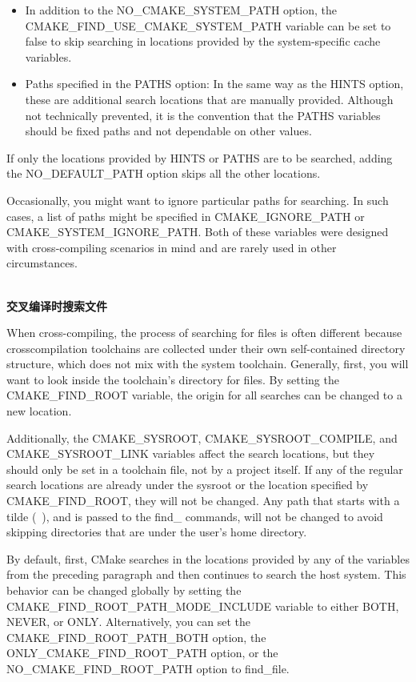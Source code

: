 \begin{itemize}
\item 
In addition to the NO\_CMAKE\_SYSTEM\_PATH option, the CMAKE\_FIND\_USE\_CMAKE\_SYSTEM\_PATH variable can be set to false to skip searching in locations provided by the system-specific cache variables.

\item 
Paths specified in the PATHS option: In the same way as the HINTS option, these are additional search locations that are manually provided. Although not technically prevented, it is the convention that the PATHS variables should be fixed paths and not dependable on other values.
\end{itemize}

If only the locations provided by HINTS or PATHS are to be searched, adding the NO\_DEFAULT\_PATH option skips all the other locations.

Occasionally, you might want to ignore particular paths for searching. In such cases, a list of paths might be specified in CMAKE\_IGNORE\_PATH or CMAKE\_SYSTEM\_IGNORE\_PATH. Both of these variables were designed with cross-compiling scenarios in mind and are rarely used in other circumstances.

\hspace*{\fill} \\ %
\noindent
\textbf{交叉编译时搜索文件}

When cross-compiling, the process of searching for files is often different because crosscompilation toolchains are collected under their own self-contained directory structure, which does not mix with the system toolchain. Generally, first, you will want to look inside the toolchain's directory for files. By setting the CMAKE\_FIND\_ROOT variable, the origin for all searches can be changed to a new location.

Additionally, the CMAKE\_SYSROOT, CMAKE\_SYSROOT\_COMPILE, and CMAKE\_SYSROOT\_LINK variables affect the search locations, but they should only be set in a toolchain file, not by a project itself. If any of the regular search locations are already under the sysroot or the location specified by CMAKE\_FIND\_ROOT, they will not be changed. Any path that starts with a tilde (~), and is passed to the find\_ commands, will not be changed to avoid skipping directories that are under the user's home directory.

By default, first, CMake searches in the locations provided by any of the variables from the preceding paragraph and then continues to search the host system. This behavior can be changed globally by setting the CMAKE\_FIND\_ROOT\_PATH\_MODE\_INCLUDE variable to either BOTH, NEVER, or ONLY. Alternatively, you can set the CMAKE\_FIND\_ROOT\_PATH\_BOTH option, the ONLY\_CMAKE\_FIND\_ROOT\_PATH option, or the NO\_CMAKE\_FIND\_ROOT\_PATH option to find\_file.

